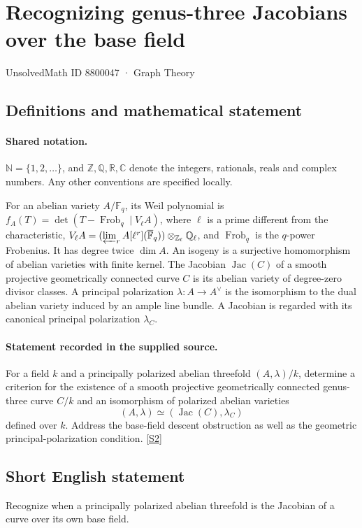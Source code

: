 \documentclass[11pt]{article}
\newcommand{\sref}[2]{\hyperlink{source:#1:#2}{[S#2]}}
\begin{document}
\setcounter{section}{8800046}
\section{Recognizing genus-three Jacobians over the base field}\label{8800047}
{\small\sffamily UnsolvedMath ID 8800047 · Graph Theory}
\subsection{Definitions and mathematical statement}

\paragraph{Shared notation.}$\mathbb N=\{1,2,\ldots\}$, and $\mathbb Z,\mathbb Q,\mathbb R,\mathbb C$ denote the integers, rationals, reals and complex numbers. Any other conventions are specified locally.


For an abelian variety $A/\mathbb F_q$, its Weil polynomial is $f_A(T)=\det(T-\operatorname{Frob}_q\mid V_\ell A)$, where $\ell$ is a prime different from the characteristic, $V_\ell A=(\varprojlim_r A[\ell^r](\overline{\mathbb F}_q))\otimes_{\mathbb Z_\ell}\mathbb Q_\ell$, and $\operatorname{Frob}_q$ is the $q$-power Frobenius. It has degree twice $\dim A$. An isogeny is a surjective homomorphism of abelian varieties with finite kernel. The Jacobian $\operatorname{Jac}(C)$ of a smooth projective geometrically connected curve $C$ is its abelian variety of degree-zero divisor classes. A principal polarization $\lambda:A\to A^\vee$ is the isomorphism to the dual abelian variety induced by an ample line bundle. A Jacobian is regarded with its canonical principal polarization $\lambda_C$.
\paragraph{Statement recorded in the supplied source.}
For a field $k$ and a principally polarized abelian threefold $(A,\lambda)/k$, determine a criterion for the existence of a smooth projective geometrically connected genus-three curve $C/k$ and an isomorphism of polarized abelian varieties
\[
(A,\lambda)\simeq(\operatorname{Jac}(C),\lambda_C)
\]
defined over $k$. Address the base-field descent obstruction as well as the geometric principal-polarization condition. \sref{8800047}{2}

\subsection{Short English statement}
Recognize when a principally polarized abelian threefold is the Jacobian of a curve over its own base field.
\end{document}
